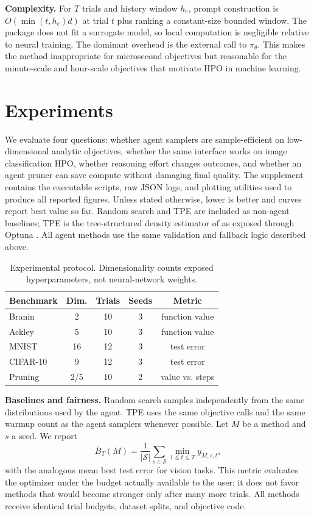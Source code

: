 \documentclass[letterpaper]{article}
\begin{document}
\textbf{Complexity.} For $T$ trials and history window $h_e$, prompt construction
is $O(\min(t,h_e)d)$ at trial $t$ plus ranking a constant-size bounded window.
The package does not fit a surrogate model, so local computation is negligible
relative to neural training. The dominant overhead is the external call to
$\pi_\theta$. This makes the method inappropriate for microsecond objectives
but reasonable for the minute-scale and hour-scale objectives that motivate HPO
in machine learning.

\section{Experiments}

We evaluate four questions: whether agent samplers are sample-efficient on
low-dimensional analytic objectives, whether the same interface works on image
classification HPO, whether reasoning effort changes outcomes, and whether an
agent pruner can save compute without damaging final quality. The supplement
contains the executable scripts, raw JSON logs, and plotting utilities used to
produce all reported figures. Unless stated otherwise, lower is better and
curves report best value so far. Random search and TPE are included as non-agent
baselines; TPE is the tree-structured density estimator of
\cite{bergstra2011algorithms} as exposed through Optuna \cite{akiba2019optuna}.
All agent methods use the same validation and fallback logic described above.

\begin{table}[t]
\centering
\begin{tabular}{lcccc}
\toprule
Benchmark & Dim. & Trials & Seeds & Metric \\
\midrule
Branin & 2 & 10 & 3 & function value \\
Ackley & 5 & 10 & 3 & function value \\
MNIST & 16 & 12 & 3 & test error \\
CIFAR-10 & 9 & 12 & 3 & test error \\
Pruning & 2/5 & 10 & 2 & value vs. steps \\
\bottomrule
\end{tabular}
\caption{Experimental protocol. Dimensionality counts exposed hyperparameters,
not neural-network weights.}
\label{tab:protocol}
\end{table}

\textbf{Baselines and fairness.} Random search samples independently from the
same distributions used by the agent. TPE uses the same objective calls and the
same warmup count as the agent samplers whenever possible. Let $M$ be a method
and $s$ a seed. We report
\begin{equation}
  \bar{B}_T(M)=\frac{1}{|\mathcal{S}|}\sum_{s\in\mathcal{S}}
  \min_{1\le t\le T} y_{M,s,t},
\end{equation}
with the analogous mean best test error for vision tasks. This metric evaluates
the optimizer under the budget actually available to the user; it does not
favor methods that would become stronger only after many more trials. All
methods receive identical trial budgets, dataset splits, and objective code.
\end{document}
